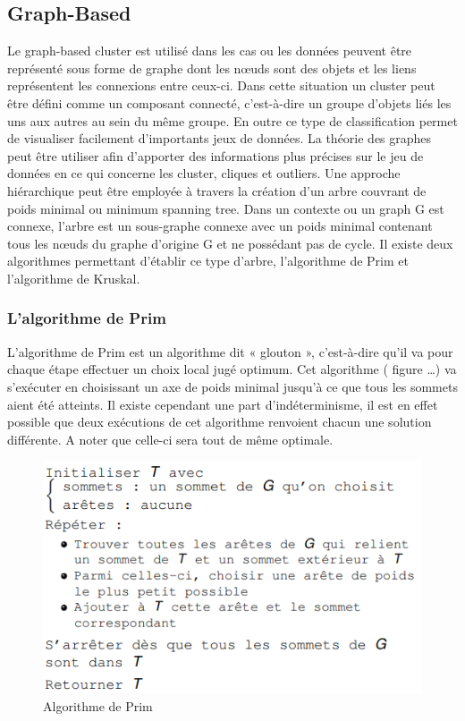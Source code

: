 \documentclass[memoire.tex]{subfiles}
\begin{document}
\subsection{Graph-Based}
Le graph-based cluster est utilisé dans les cas ou les données peuvent être représenté sous forme de graphe dont les nœuds sont des objets et les liens représentent les connexions entre ceux-ci. Dans cette situation un cluster peut être défini comme un composant connecté,  c'est-à-dire un groupe d'objets liés les uns aux autres au sein du même groupe. En outre ce type de classification permet de visualiser facilement d'importants jeux de données.
La théorie des graphes peut être utiliser afin d’apporter des informations plus précises sur le jeu de données en ce qui concerne les cluster, cliques et outliers. Une approche hiérarchique peut être employée à travers la création d’un arbre couvrant de poids minimal ou minimum spanning tree. Dans un contexte ou un graph G est connexe, l’arbre est un sous-graphe connexe avec un poids minimal contenant tous les nœuds du graphe d’origine G et ne possédant pas de cycle. Il existe deux algorithmes permettant d’établir ce type d’arbre, l’algorithme de Prim et l’algorithme de Kruskal.
\subsubsection{L'algorithme de Prim}
L’algorithme de Prim est un algorithme dit « glouton », c'est-à-dire qu’il va pour chaque étape effectuer un choix local jugé optimum. Cet algorithme ( figure …) va s’exécuter en choisissant un axe de poids minimal jusqu’à ce que tous les sommets aient été atteints. Il existe cependant une part d'indéterminisme, il est en effet possible que deux exécutions de cet algorithme renvoient chacun une solution différente. A noter que celle-ci sera tout de même optimale.
	\begin{figure}[h!]
		\centerline{\includegraphics[scale=0.8]{img/prim.png}}
		\caption{Algorithme de Prim}
	\end{figure}
\newpage
\end{document}
